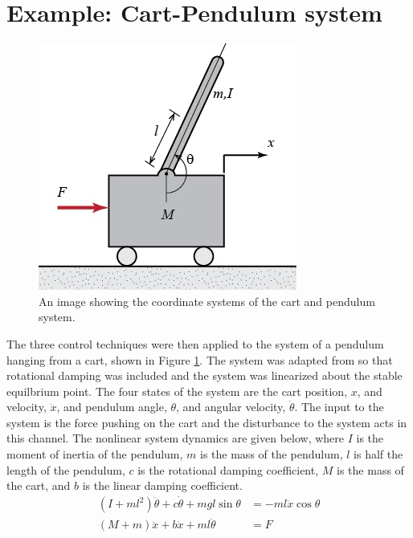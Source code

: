 \documentclass[12 pt]{report}
\begin{document}
\section{Example: Cart-Pendulum system}

\begin{figure}
	\includegraphics[width=\linewidth]{cart-pendulum.jpg}
	\caption{An image showing the coordinate systems of the cart and pendulum system.}
	\label{fig:cart-pendulum}
\end{figure}

The three control techniques were then applied to the system of a pendulum hanging from a cart, shown in Figure \ref{fig:cart-pendulum}. The system was adapted from \cite{pendulum} so that rotational damping was included and the system was linearized about the stable equilbrium point. The four states of the system are the cart position, $x$, and velocity, $\dot{x}$, and pendulum angle, $\theta$, and angular velocity, $\dot{\theta}$. The input to the system is the force pushing on the cart and the disturbance to the system acts in this channel. The nonlinear system dynamics are given below, where $I$ is the moment of inertia of the pendulum, $m$ is the mass of the pendulum, $l$ is half the length of the pendulum, $c$ is the rotational damping coefficient, $M$ is the mass of the cart, and $b$ is the linear damping coefficient.
\begin{align*}
(I+ml^2)\ddot{\theta} + c \dot{\theta} + mgl \sin \theta &= -ml \ddot{x} \cos \theta \\
(M+m)\ddot{x} + b\dot{x} + ml \ddot{\theta} &= F
\end{align*}
\end{document}
